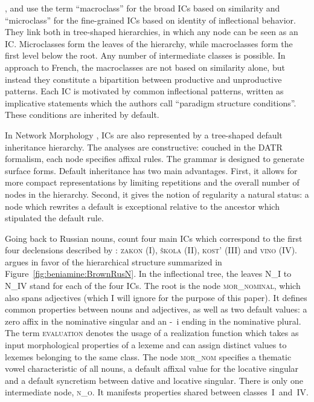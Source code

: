 \documentclass[output=paper]{langscibook}
\begin{document}
    \citet{DresslerThornton1996}, \citet{Kilani-SchochDressler2005} and \citet{DresslerKilani-SchochGagarinaPestalPoechtrager2008} use the term ``macroclass'' for the broad ICs based on similarity and ``microclass'' for the fine-grained ICs based on identity of inflectional behavior. They link both in tree-shaped hierarchies, in which any node can be seen as an IC. Microclasses form the leaves of the hierarchy, while macroclasses form the first level below the root. Any number of intermediate classes is possible. In  approach to French, the macroclasses are not based on similarity alone, but instead they constitute a bipartition between productive and unproductive patterns. Each IC is motivated by common inflectional patterns, written as implicative statements which the authors call ``paradigm structure conditions''. These conditions are inherited by default.
    
    In Network Morphology \citep{CorbettFraser1993,BrownHippisley2012}, ICs are also represented by a tree-shaped default inheritance hierarchy. The analyses are constructive: couched in the DATR formalism, each node specifies affixal rules. The grammar is designed to generate surface forms. Default inheritance has two main advantages. First, it allows for more compact representations by limiting repetitions and the overall number of nodes in the hierarchy. Second, it gives the notion of regularity a natural status: a node which rewrites a default is exceptional relative to the ancestor which stipulated the default rule.
    
    Going back to Russian nouns, \citet{Brown1998} count four main ICs which correspond to the first four declensions described by \citet{Corbett1982}: 
    \textsc{zakon} (I), \textsc{škola} (II), \textsc{kost'} (III) and  \textsc{vino} (IV). \citet{Brown1998} argues in favor of the hierarchical structure summarized in Figure~\ref{fig:beniamine:BrownRusN}. In the inflectional tree, the leaves \textsc{N\_I} to \textsc{N\_IV} stand for each of the four ICs. The root is the node \textsc{mor\_nominal}, which also spans adjectives (which I will ignore for the purpose of this paper). It defines common properties between nouns and adjectives, as well as two default values: a zero affix in the nominative singular and an \unit{-i} ending in the nominative plural. The term \textsc{evaluation} denotes the usage of a realization function which takes as input morphological properties of a lexeme and can assign distinct values to lexemes belonging to the same class. The node \textsc{mor\_nom} specifies a thematic vowel characteristic of all nouns, a default affixal value for the locative singular and a default syncretism between dative and locative singular. There is only one intermediate node, \textsc{n\_o}. It manifests properties shared between classes~I~and~IV. 
    
\end{document}
